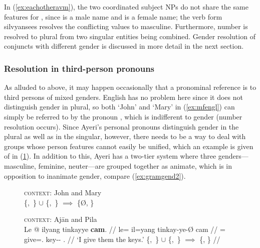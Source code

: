 In (\ref{ex:eachotheravm}), the two coordinated subject NPs do not share the
same features for \Gend{}, since  is a male name and
 is a female name; the verb form 
{silvyan}{sees} resolves the conflicting values to masculine. Furthermore,
number is resolved to plural from two singular entities being combined.
Gender resolution of conjuncts with different gender is discussed in more
detail in the next section.

\subsubsection{Resolution in third-person pronouns}


As alluded to above, it may happen occasionally that a pronominal reference is
to third persons of mixed genders. English has no problem here since it does
not distinguish gender in plural, so both `John' and `Mary' in
(\ref{ex:mfengl}) can simply be referred to by the pronoun , which is
indifferent to gender (number resolution occurs). Since Ayeri's personal
pronouns distinguish gender in the plural as well as in the singular, however,
there needs to be a way to deal with groups whose person features cannot easily
be unified, which an example is given of in (\ref{ex:mfayeri}). In addition to
this, Ayeri has a two-tier system where three genders---masculine, feminine,
neuter---are grouped together as animate, which is in opposition to inanimate
gender, compare (\ref{ex:gramgend2}).

\begin{figure}[h]
\pex
\a\label{ex:mfengl}%
	\textsc{context:} John and Mary \medskip \\
	\hfill \{\M{},~\Sg{}\} $\cup$  \{\F{},~\Sg{}\} $\implies$ \{Ø, \Pl\}

\a\label{ex:mfayeri}%
	\textsc{context:} Ajān and Pila \medskip \\
	\begingl
	\gla Le @ ilyang tinkayye \textbf{cam}. //
	\glb le= il=yang tinkay-ye-Ø cam //
	\glc \PatTI{}= give=\Fsg{}.\Aarg{} key-\Pl{}-\Top{} \TplM{}.\Dat{} //
	\glft `I give them the keys.' 
	\hfill \{\M{},~\Sg{}\} $\cup$ \{\F{},~\Sg{}\} $\implies$ \{\M, \Pl\} //
	\endgl
\xe
\end{figure}


